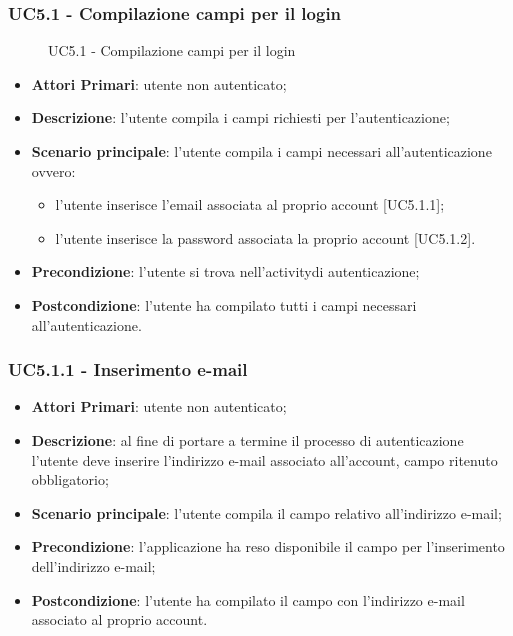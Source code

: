 \subsubsection{UC5.1 - Compilazione campi per il login}
\begin{figure}[h]
	\centering
	\caption{UC5.1 - Compilazione campi per il login}
\end{figure}
\begin{itemize}
	\item \textbf{Attori Primari}: utente non autenticato;
	\item \textbf{Descrizione}: l'utente compila i campi richiesti per l'autenticazione;
	\item \textbf{Scenario principale}: l'utente compila i campi necessari all'autenticazione ovvero:
		\begin{itemize}
			\item l'utente inserisce l'email associata al proprio account [UC5.1.1];
			\item l'utente inserisce la password associata la proprio account [UC5.1.2].
		\end{itemize}	
	\item \textbf{Precondizione}: l'utente si trova nell'activity\glosp di autenticazione;
	\item \textbf{Postcondizione}: l'utente ha compilato tutti i campi necessari all'autenticazione.	
\end{itemize}

\subsubsection{UC5.1.1 - Inserimento e-mail}
\begin{itemize}
	\item \textbf{Attori Primari}: utente non autenticato;
	\item \textbf{Descrizione}: al fine di portare a termine il processo di autenticazione l'utente deve inserire l'indirizzo e-mail associato all'account, campo ritenuto obbligatorio;
	\item \textbf{Scenario principale}: l'utente compila il campo relativo all'indirizzo e-mail;	
	\item \textbf{Precondizione}: l'applicazione ha reso disponibile il campo per l'inserimento dell'indirizzo e-mail;
	\item \textbf{Postcondizione}: l'utente ha compilato il campo con l'indirizzo e-mail associato al proprio account.
\end{itemize}

